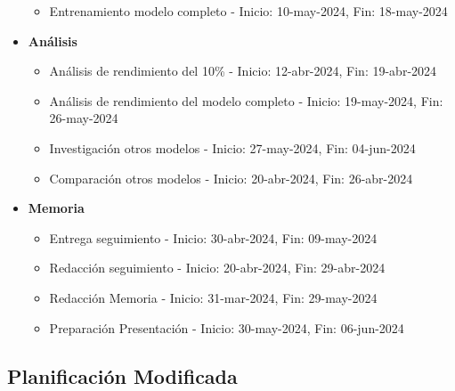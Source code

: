 \begin{itemize}
\begin{itemize}
        \item Entrenamiento modelo completo - Inicio: 10-may-2024, Fin: 18-may-2024
    \end{itemize}
    \item \textbf{Análisis}
    \begin{itemize}
        \item Análisis de rendimiento del 10\% - Inicio: 12-abr-2024, Fin: 19-abr-2024
        \item Análisis de rendimiento del modelo completo - Inicio: 19-may-2024, Fin: 26-may-2024
        \item Investigación otros modelos - Inicio: 27-may-2024, Fin: 04-jun-2024
        \item Comparación otros modelos - Inicio: 20-abr-2024, Fin: 26-abr-2024
    \end{itemize}
    \item \textbf{Memoria}
    \begin{itemize}
        \item Entrega seguimiento - Inicio: 30-abr-2024, Fin: 09-may-2024
        \item Redacción seguimiento - Inicio: 20-abr-2024, Fin: 29-abr-2024
        \item Redacción Memoria - Inicio: 31-mar-2024, Fin: 29-may-2024
        \item Preparación Presentación - Inicio: 30-may-2024, Fin: 06-jun-2024
    \end{itemize}
\end{itemize}

\subsection{Planificación Modificada}

